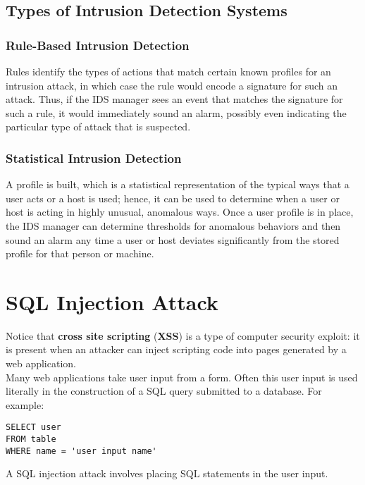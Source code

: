 \subsection{Types of Intrusion Detection Systems} 
\subsubsection{Rule-Based Intrusion Detection} 
Rules identify the types of actions that match certain known profiles for an intrusion attack, in which case the rule would encode a signature for such an attack. Thus, if the IDS manager sees an event that matches the signature for such a rule, it would immediately sound an alarm, possibly even indicating the particular type of attack that is
suspected.
\subsubsection{Statistical Intrusion Detection}
A profile is built, which is a statistical representation of the typical ways that a user acts or a host is used; hence, it can be used to determine when a user or host is acting in highly unusual, anomalous ways.
Once a user profile is in place, the IDS manager can determine thresholds for anomalous behaviors and then sound an alarm any time a user or host deviates significantly from the stored profile for that person or machine.
\section{SQL Injection Attack}
Notice that \textbf{cross site scripting} (\textbf{XSS}) is a type of computer security exploit: it is present when an attacker can inject scripting code into pages generated by a web application.\\
Many web applications take user input from a form. Often this user input is used literally in the construction of a SQL query submitted to a database. For example:
\begin{lstlisting}
SELECT user 
FROM table
WHERE name = 'user input name'
\end{lstlisting}
A SQL injection attack involves placing SQL statements in the user input.
